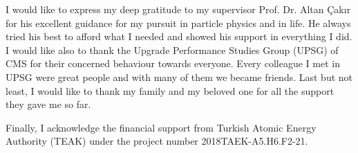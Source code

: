 \vspace*{-6pt}
I would like to express my deep gratitude to my supervisor Prof. Dr. Altan Çakır for his excellent guidance for my pursuit in particle physics and in life. He always tried his best to afford what I needed and showed his support in everything I did. I would like also to thank the Upgrade Performance Studies Group (UPSG) of CMS for their concerned behaviour towards everyone. Every colleague I met in UPSG were great people and with many of them we became friends. Last but not least, I would like to thank my family and my beloved one for all the support they gave me so far.

Finally, I acknowledge the financial support from Turkish Atomic Energy Authority (TEAK) under the project number 2018TAEK-A5.H6.F2-21.